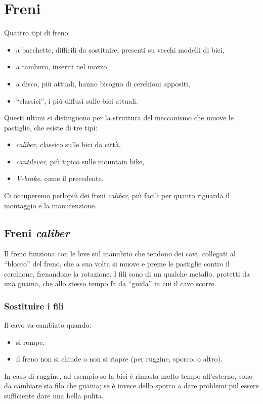 \chapter{Freni}
Quattro tipi di freno:
\begin{itemize}
  \item a bacchette, difficili da sostituire, presenti su vecchi modelli di bici,
  \item a tamburo, inseriti nel mozzo,
  \item a disco, più attuali, hanno bisogno di cerchioni appositi,
  \item ``classici'', i più diffusi sulle bici attuali.
\end{itemize}
Questi ultimi si distinguono per la struttura del meccanismo che muove le pastiglie, che esiste di tre tipi:
\begin{itemize}
  \item \textit{caliber}, classico sulle bici da città,
  \item \textit{cantilever}, più tipico sulle mountain bike,
  \item \textit{V-brake}, come il precedente.
\end{itemize}

Ci occuperemo perlopiù dei freni \textit{caliber}, più facili per quanto riguarda il montaggio e la manutenzione.

\section{Freni \textit{caliber}}
Il freno funziona con le leve sul manubrio che tendono dei cavi, collegati al ``blocco'' del freno, che a sua volta si muove e preme le pastiglie contro il cerchione, frenandone la rotazione.
I fili sono di un qualche metallo, protetti da una guaina, che allo stesso tempo fa da ``guida'' in cui il cavo scorre.

\subsection{Sostituire i fili}
Il cavo va cambiato quando:
\begin{itemize}
  \item si rompe,
  \item il freno non si chiude o non si riapre (per ruggine, sporco, o altro).
\end{itemize}
In caso di ruggine, ad esempio se la bici è rimasta molto tempo all'esterno, sono da cambiare sia filo che guaina; se è invece dello sporco a dare problemi pul essere sufficiente dare una bella pulita.


